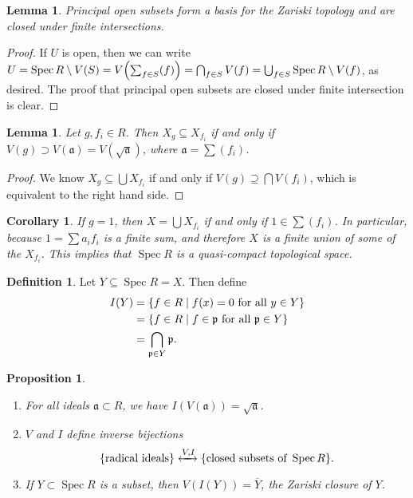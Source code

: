 \documentclass[leqno, openany]{memoir}
\newtheorem{cor}[thm]{Corollary}
\newtheorem{prop}[thm]{Proposition}
\newtheorem{lem}[thm]{Lemma}
\theoremstyle{definition}
\newtheorem{defn}[thm]{Definition}
\theoremstyle{remark}
\theoremstyle{plain}
\theoremstyle{definition}
\theoremstyle{remark}
\newcommand{\mf}[1]{\mathfrak{#1}}
\newcommand{\ol}[1]{\overline{#1}}
\DeclareMathOperator{\Spec}{Spec}
\begin{document}
\begin{lem}
    Principal open subsets form a basis for the Zariski topology and are closed under finite intersections.
\end{lem}

\begin{proof}
    If $U$ is open, then we can write $U = \Spec R \setminus V(S) = V\qty(\sum_{f \in S} (f)) = \bigcap_{f \in S} V(f) = \bigcup_{f \in S} \Spec R \setminus V(f)$, as desired. The proof that principal open subsets are closed under finite intersection is clear.
\end{proof}

\begin{lem}
    Let $g, f_i \in R$. Then $X_g \subseteq X_{f_i}$ if and only if $V(g) \supset V(\mf{a}) = V(\sqrt{\mf{a}})$, where $\mf{a} = \sum (f_i)$.
\end{lem}

\begin{proof}
    We know $X_g \subseteq \bigcup X_{f_i}$ if and only if $V(g) \supseteq \bigcap V(f_i)$, which is equivalent to the right hand side.
\end{proof}

\begin{cor}
    If $g = 1$, then $X = \bigcup X_{f_i}$ if and only if $1 \in \sum (f_i)$. In particular, because $1 = \sum a_i f_i$ is a finite sum, and therefore $X$ is a finite union of some of the $X_{f_i}$. This implies that $\Spec R$ is a quasi-compact topological space.
\end{cor}

\begin{defn}
    Let $Y \subseteq \Spec R = X$. Then define
    \begin{align*}
        I(Y) &= \qty{f \in R \mid f(x) = 0 \text{ for all }y \in Y} \\
             &= \qty{f \in R \mid f \in \mf{p}\text{ for all } \mf{p} \in Y} \\
             &= \bigcap_{\mf{p} \in Y} \mf{p}.
    \end{align*}
\end{defn}

\begin{prop}
    \begin{enumerate}
        \item For all ideals $\mf{a} \subset R$, we have $I(V(\mf{a})) = \sqrt{\mf{a}}$.
        \item $V$ and $I$ define inverse bijections
            \[ \qty{\text{radical ideals}} \xleftrightarrow{V,I} \qty{\text{closed subsets of }\Spec R}. \]
        \item If $Y \subset \Spec R$ is a subset, then $V(I(Y)) = \ol{Y}$, the Zariski closure of $Y$.
    \end{enumerate}
\end{prop}
\end{document}
